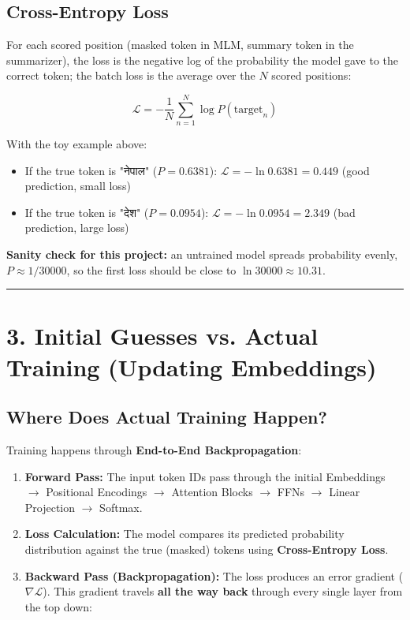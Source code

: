 \documentclass[11pt,a4paper,oneside]{report}
\providecommand{\tightlist}{\setlength{\itemsep}{0pt}\setlength{\parskip}{0pt}}
\begin{document}
\subsection{Cross-Entropy Loss}\label{cross-entropy-loss}

For each scored position (masked token in MLM, summary token in the summarizer), the loss is the negative log of the probability the model gave to the correct token; the batch loss is the average over the \(N\) scored positions:

\[\mathcal{L} = -\frac{1}{N} \sum_{n=1}^{N} \log P(\text{target}_n)\]

With the toy example above:

\begin{itemize}
\tightlist
\item
  If the true token is "नेपाल" (\(P = 0.6381\)): \(\mathcal{L} = -\ln 0.6381 = 0.449\) (good prediction, small loss)
\item
  If the true token is "देश" (\(P = 0.0954\)): \(\mathcal{L} = -\ln 0.0954 = 2.349\) (bad prediction, large loss)
\end{itemize}

\textbf{Sanity check for this project:} an untrained model spreads probability evenly, \(P \approx 1/30000\), so the first loss should be close to \(\ln 30000 \approx 10.31\).

\begin{center}\rule{0.5\linewidth}{0.5pt}\end{center}

\section{3. Initial Guesses vs. Actual Training (Updating Embeddings)}\label{3-initial-guesses-vs-actual-training-updating-embeddings}

\subsection{Where Does Actual Training Happen?}\label{where-does-actual-training-happen}

Training happens through \textbf{End-to-End Backpropagation}:

\begin{enumerate}
\def\labelenumi{\arabic{enumi}.}
\tightlist
\item
  \textbf{Forward Pass:} The input token IDs pass through the initial Embeddings \(\rightarrow\) Positional Encodings \(\rightarrow\) Attention Blocks \(\rightarrow\) FFNs \(\rightarrow\) Linear Projection \(\rightarrow\) Softmax.
\item
  \textbf{Loss Calculation:} The model compares its predicted probability distribution against the true (masked) tokens using \textbf{Cross-Entropy Loss}.
\item
  \textbf{Backward Pass (Backpropagation):} The loss produces an error gradient (\(\nabla \mathcal{L}\)). This gradient travels \textbf{all the way back} through every single layer from the top down:
\end{enumerate}
\end{document}
